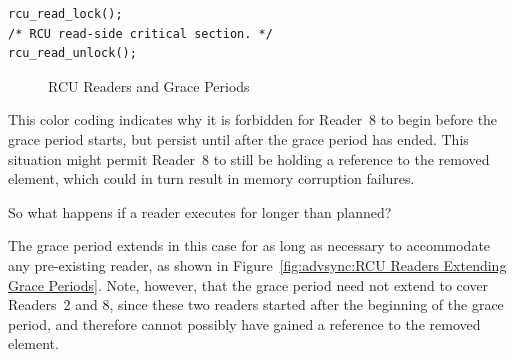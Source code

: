 \vspace{5pt}
\begin{minipage}[t]{\columnwidth}
\begin{verbatim}
rcu_read_lock();
/* RCU read-side critical section. */
rcu_read_unlock();
\end{verbatim}
\end{minipage}
\vspace{5pt}

\begin{figure}[htb]
\begin{center}
\end{center}
\caption{RCU Readers and Grace Periods}
\label{fig:advsync:RCU Readers and Grace Periods}
\end{figure}

This color coding indicates why it is forbidden for Reader~8 to
begin before the grace period starts, but persist until after the
grace period has ended.
This situation might permit Reader~8 to still be holding a reference
to the removed element, which could in turn result in memory corruption
failures.

So what happens if a reader executes for longer than planned?

The grace period extends in this case for as long as necessary to
accommodate any pre-existing reader, as shown in
Figure~\ref{fig:advsync:RCU Readers Extending Grace Periods}.
Note, however, that the grace period need not extend to cover Readers~2
and 8, since these two readers started after the beginning of the
grace period, and therefore cannot possibly have gained a reference
to the removed element.

